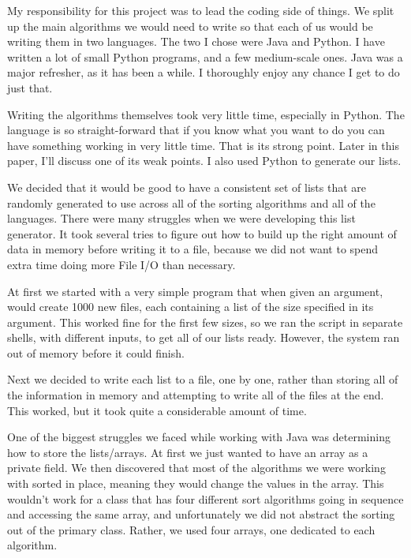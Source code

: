 
My responsibility for this project was to lead the coding side of things. We
split up the main algorithms we would need to write so that each of us would be
writing them in two languages. The two I chose were Java and Python. I have
written a lot of small Python programs, and a few medium-scale ones. Java was a
major refresher, as it has been a while. I thoroughly enjoy any chance I get to
do just that. 

Writing the algorithms themselves took very little time, especially in Python. 
The language is so straight-forward that if you know what you want to do you 
can have something working in very little time. That is its strong point. Later 
in this paper, I'll discuss one of its weak points. I also used Python to 
generate our lists. 

We decided that it would be good to have a consistent set of lists that are 
randomly generated to use across all of the sorting algorithms and all of the 
languages. There were many struggles when we were developing this list generator.
It took several tries to figure out how to build up the right amount of data in 
memory before writing it to a file, because we did not want to spend extra time 
doing more File I/O than necessary. 

At first we started with a very simple program that when given an argument, would
create 1000 new files, each containing a list of the size specified in its 
argument. This worked fine for the first few sizes, so we ran the script in 
separate shells, with different inputs, to get all of our lists ready. However,
the system ran out of memory before it could finish.

Next we decided to write each list to a file, one by one, rather than storing all 
of the information in memory and attempting to write all of the files at the end. 
This worked, but it took quite a considerable amount of time.

One of the biggest struggles we faced while working with Java was determining how 
to store the lists/arrays. At first we just wanted to have an array as a private 
field. We then discovered that most of the algorithms we were working with sorted 
in place, meaning they would change the values in the array. This wouldn't work 
for a class that has four different sort algorithms going in sequence and
accessing the same array, and unfortunately we did not abstract the sorting out 
of the primary class. Rather, we used four arrays, one dedicated to each 
algorithm.

